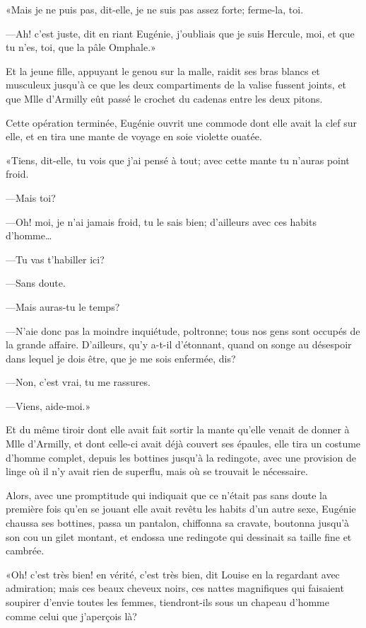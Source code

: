 «Mais je ne puis pas, dit-elle, je ne suis pas assez forte; ferme-la, toi. 

—Ah! c'est juste, dit en riant Eugénie, j'oubliais que je suis Hercule, moi, et que tu n'es, toi, que la pâle Omphale.» 

Et la jeune fille, appuyant le genou sur la malle, raidit ses bras blancs et musculeux jusqu'à ce que les deux compartiments de la valise fussent joints, et que Mlle d'Armilly eût passé le crochet du cadenas entre les deux pitons. 

Cette opération terminée, Eugénie ouvrit une commode dont elle avait la clef sur elle, et en tira une mante de voyage en soie violette ouatée. 

«Tiens, dit-elle, tu vois que j'ai pensé à tout; avec cette mante tu n'auras point froid. 

—Mais toi? 

—Oh! moi, je n'ai jamais froid, tu le sais bien; d'ailleurs avec ces habits d'homme\dots 

—Tu vas t'habiller ici? 

—Sans doute. 

—Mais auras-tu le temps? 

—N'aie donc pas la moindre inquiétude, poltronne; tous nos gens sont occupés de la grande affaire. D'ailleurs, qu'y a-t-il d'étonnant, quand on songe au désespoir dans lequel je dois être, que je me sois enfermée, dis? 

—Non, c'est vrai, tu me rassures. 

—Viens, aide-moi.» 

Et du même tiroir dont elle avait fait sortir la mante qu'elle venait de donner à Mlle d'Armilly, et dont celle-ci avait déjà couvert ses épaules, elle tira un costume d'homme complet, depuis les bottines jusqu'à la redingote, avec une provision de linge où il n'y avait rien de superflu, mais où se trouvait le nécessaire. 

Alors, avec une promptitude qui indiquait que ce n'était pas sans doute la première fois qu'en se jouant elle avait revêtu les habits d'un autre sexe, Eugénie chaussa ses bottines, passa un pantalon, chiffonna sa cravate, boutonna jusqu'à son cou un gilet montant, et endossa une redingote qui dessinait sa taille fine et cambrée. 

«Oh! c'est très bien! en vérité, c'est très bien, dit Louise en la regardant avec admiration; mais ces beaux cheveux noirs, ces nattes magnifiques qui faisaient soupirer d'envie toutes les femmes, tiendront-ils sous un chapeau d'homme comme celui que j'aperçois là? 

